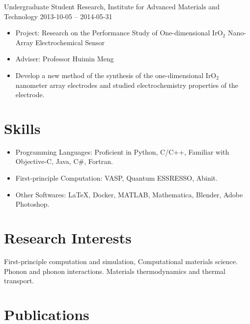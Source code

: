 \documentclass[
  a4paper,
  12pt
]{article}
\newcommand{\LongMonth}[1]{%
\ifcase#1\relax
\or January%
\or February%
\or March%
\or April%
\or May%
\or June%
\or July%
\or August%
\or September%
\or October%
\or November%
\or December%
\fi}
\newcommand{\ShortMonth}[1]{%
\ifcase#1\relax
\or Jan%
\or Feb%
\or Mar%
\or Apr%
\or May%
\or Jun%
\or Jul%
\or Aug%
\or Sep%
\or Oct%
\or Nov%
\or Dec%
\fi}
\newcommand{\DatestampYMD}[3]{\mbox{#1-#2-#3}}
\newcommand{\DatestampYMD}[3]{\mbox{\ShortMonth{#2} #1}}
\newcommand{\DatestampYMD}[3]{\mbox{\LongMonth{#2} #1}}
\newcommand{\DatestampYMD}[3]{#1}
\begin{document}

\vspace{.25em}
Undergraduate Student Research, 
Institute for Advanced Materials and Technology
\hfill
\DatestampYMD{2013}{10}{05} --
\DatestampYMD{2014}{05}{31}
\begin{itemize}
\item Project: Research on the Performance Study of One-dimensional IrO$_{2}$ Nano-Array Electrochemical Sensor
\item Adviser: Professor Huimin Meng
\item Develop a new method of the synthesis of the one-dimensional IrO$_{2}$ nanometer array electrodes and studied electrochemistry properties of the electrode.
\end{itemize}


\section{Skills}
\begin{itemize}
\item
Programming Languages:   
Proficient in
Python, C/C++, 
Familiar with Objective-C, Java, C\#, Fortran.
\item
First-principle Computation:   
VASP, Quantum ESSRESSO, Abinit.
\item
Other Softwares:    
{\LaTeX}, 
Docker,
MATLAB, 
Mathematica, 
Blender,
Adobe Photoshop.
\end{itemize}


\section{Research Interests}
First-principle computation and simulation, Computational materials science. Phonon and phonon interactions. Materials thermodynamics and thermal transport.


\section{Publications}
\end{document}
